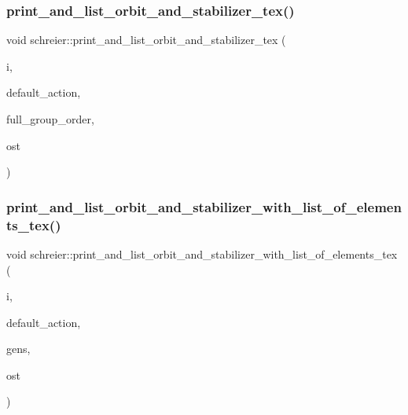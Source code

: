 \mbox{\label{classschreier_a52098502f3919b9b57e1ebb4feba42bb}} 
\subsubsection{\texorpdfstring{print\+\_\+and\+\_\+list\+\_\+orbit\+\_\+and\+\_\+stabilizer\+\_\+tex()}{print\_and\_list\_orbit\_and\_stabilizer\_tex()}}
{\footnotesize\ttfamily void schreier\+::print\+\_\+and\+\_\+list\+\_\+orbit\+\_\+and\+\_\+stabilizer\+\_\+tex (\begin{DoxyParamCaption}\item[{\mbox{\hyperlink{galois_8h_a09fddde158a3a20bd2dcadb609de11dc}{I\+NT}}}]{i,  }\item[{\mbox{\hyperlink{classaction}{action}} $\ast$}]{default\+\_\+action,  }\item[{\mbox{\hyperlink{classlonginteger__object}{longinteger\+\_\+object}} \&}]{full\+\_\+group\+\_\+order,  }\item[{ostream \&}]{ost }\end{DoxyParamCaption})}

\mbox{\label{classschreier_a6e37f40487e0dc0941ebb36d9250a4c5}} 
\subsubsection{\texorpdfstring{print\+\_\+and\+\_\+list\+\_\+orbit\+\_\+and\+\_\+stabilizer\+\_\+with\+\_\+list\+\_\+of\+\_\+elements\+\_\+tex()}{print\_and\_list\_orbit\_and\_stabilizer\_with\_list\_of\_elements\_tex()}}
{\footnotesize\ttfamily void schreier\+::print\+\_\+and\+\_\+list\+\_\+orbit\+\_\+and\+\_\+stabilizer\+\_\+with\+\_\+list\+\_\+of\+\_\+elements\+\_\+tex (\begin{DoxyParamCaption}\item[{\mbox{\hyperlink{galois_8h_a09fddde158a3a20bd2dcadb609de11dc}{I\+NT}}}]{i,  }\item[{\mbox{\hyperlink{classaction}{action}} $\ast$}]{default\+\_\+action,  }\item[{\mbox{\hyperlink{classstrong__generators}{strong\+\_\+generators}} $\ast$}]{gens,  }\item[{ostream \&}]{ost }\end{DoxyParamCaption})}

